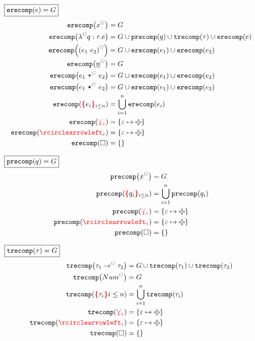 \noindent $\boxed{\operatorname{\texttt{erecomp}}\mathopen{}\left(e\right)\mathclose{} = G}$
%
\begin{align*}
  \erecomp{\eVar{G}{x}} &= G
  \\
  \erecomp{\eFun{G}{q}{\tau}{e}}
    &= G \cup \precomp{q} \cup \trecomp{\tau} \cup \erecomp{e}
  \\
  \erecomp{\eApp{G}{e_1}{e_2}}
    &= G \cup \erecomp{e_1} \cup \erecomp{e_2}
  \\
  \erecomp{\eNum{G}{n}} &= G
  \\
  \erecomp{\ePlus{G}{e_1}{e_2}}
    &= G \cup \erecomp{e_1} \cup \erecomp{e_2}
  \\
  \erecomp{\eTimes{G}{e_1}{e_2}}
    &= G \cup \erecomp{e_1} \cup \erecomp{e_2}
  \\
  \erecomp{\conflictHoleForm{e_i}{i \leq n}}
  &= \bigcup_{i=1}^n \erecomp{e_i}
  \\
  \erecomp{\multiVertex{\e}} &= \SetOf{\e \mapsto \Plus}
  \\
  \erecomp{\cycleVertex{\e}} &= \SetOf{\e \mapsto \Plus}
  \\
  \erecomp{\hole} &= \SetOf{}
\end{align*}

\noindent $\boxed{\operatorname{\texttt{precomp}}\mathopen{}\left(q\right)\mathclose{} = G}$
%
\begin{align*}
  \precomp{\pVar{G}{x}} &= G
  \\
  \precomp{\conflictHoleForm{q_i}{i \leq n}} &= \bigcup_{i=1}^n \precomp{q_i}
  \\
  \precomp{\multiVertex{\e}} &= \SetOf{\e \mapsto \Plus}
  \\
  \precomp{\cycleVertex{\e}} &= \SetOf{\e \mapsto \Plus}
  \\
  \precomp{\hole} &= \SetOf{}
\end{align*}

\noindent $\boxed{\operatorname{\texttt{trecomp}}\mathopen{}\left(\tau\right)\mathclose{} = G}$
%
\begin{align*}
  \trecomp{\tArrow{G}{\tau_1}{\tau_2}}
    &= G \cup \trecomp{\tau_1} \cup \trecomp{\tau_2}
  \\
  \trecomp{\tNum{G}} &= G
  \\
  \trecomp{\conflictHole{\tau_i}{i \leq n}} &= \bigcup_{i=1}^n \trecomp{\tau_i}
  \\
  \trecomp{\multiVertex{\e}} &= \SetOf{\e \mapsto \Plus}
  \\
  \trecomp{\cycleVertex{\e}} &= \SetOf{\e \mapsto \Plus}
  \\
  \trecomp{\hole} &= \SetOf{}
\end{align*}



